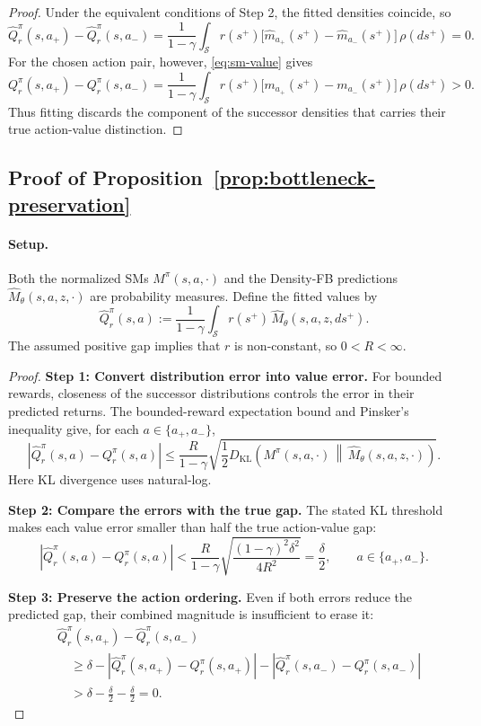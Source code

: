 \begin{proof}
Under the equivalent conditions of Step 2, the fitted densities coincide, so
\[
    \widehat Q_r^\pi(s,a_+)-\widehat Q_r^\pi(s,a_-)
    =\frac{1}{1-\gamma}
    \int_{\mathcal S}r(s^+)
    \bigl[\widehat m_{a_+}(s^+)-\widehat m_{a_-}(s^+)\bigr]
    \,\rho(ds^+)=0.
\]
For the chosen action pair, however, \eqref{eq:sm-value} gives
\[
    Q_r^\pi(s,a_+)-Q_r^\pi(s,a_-)
    =\frac{1}{1-\gamma}
    \int_{\mathcal S}r(s^+)
    \bigl[m_{a_+}(s^+)-m_{a_-}(s^+)\bigr]
    \,\rho(ds^+)>0.
\]
Thus fitting discards the component of the successor densities that carries their true action-value distinction.
\end{proof}

\subsection{Proof of Proposition~\ref{prop:bottleneck-preservation}}

\paragraph{Setup.}
Both the normalized SMs $M^\pi(s,a,\cdot)$ and the Density-FB predictions $\widehat M_\theta(s,a,z,\cdot)$ are probability measures.
Define the fitted values by
\[
    \widehat Q_r^\pi(s,a) :=\frac{1}{1-\gamma} \int_{\mathcal S} r(s^+)\,\widehat M_\theta(s,a,z,ds^+).
\]
The assumed positive gap implies that $r$ is non-constant, so $0<R<\infty$.

\begin{proof}
\noindent\textbf{Step 1: Convert distribution error into value error.}
For bounded rewards, closeness of the successor distributions controls the error in their predicted returns.
The bounded-reward expectation bound and Pinsker's inequality give, for each $a\in\{a_+,a_-\}$,
\[
    \left| \widehat Q_r^\pi(s,a)-Q_r^\pi(s,a) \right| \le \frac{R}{1-\gamma} \sqrt{ \frac12 D_{\mathrm{KL}}\!\left( M^\pi(s,a,\cdot) \,\middle\|\, \widehat M_\theta(s,a,z,\cdot) \right) }.
\]
Here KL divergence uses natural-log.

\noindent\textbf{Step 2: Compare the errors with the true gap.}
The stated KL threshold makes each value error smaller than half the true action-value gap:
\[
    \left| \widehat Q_r^\pi(s,a)-Q_r^\pi(s,a) \right| < \frac{R}{1-\gamma} \sqrt{\frac{(1-\gamma)^2\delta^2}{4R^2}} =\frac{\delta}{2}, \qquad a\in\{a_+,a_-\}.
\]

\noindent\textbf{Step 3: Preserve the action ordering.}
Even if both errors reduce the predicted gap, their combined magnitude is insufficient to erase it:
\[
\begin{aligned}
    &\widehat Q_r^\pi(s,a_+)-\widehat Q_r^\pi(s,a_-)\\
    &\quad\ge
    \delta -\left|\widehat Q_r^\pi(s,a_+)-Q_r^\pi(s,a_+)\right| -\left|\widehat Q_r^\pi(s,a_-)-Q_r^\pi(s,a_-)\right|\\
    &\quad> \delta-\frac{\delta}{2}-\frac{\delta}{2} =0.
\end{aligned}
\]
\end{proof}


